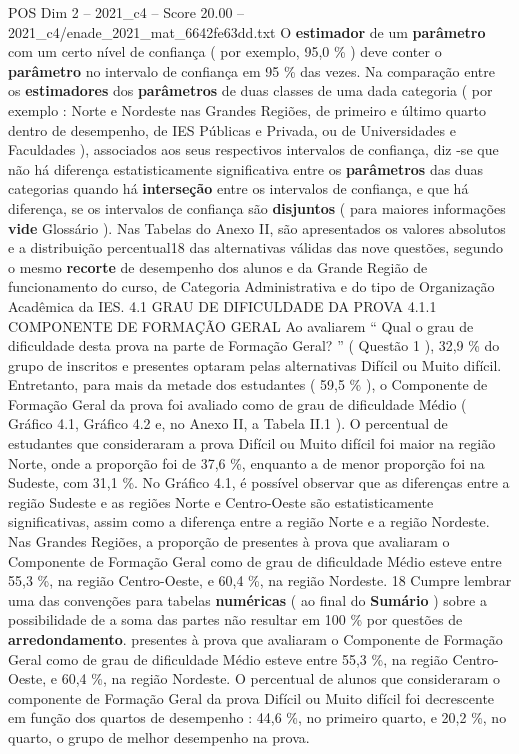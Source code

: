 \begin{textsample}{POS Dim 2 – 2021\_c4 – Score 20.00 – 2021\_c4/enade\_2021\_mat\_6642fe63dd.txt}
O \textbf{estimador} de um \textbf{parâmetro} com um certo nível de confiança ( por exemplo, 95,0 \% ) deve conter o \textbf{parâmetro} no intervalo de confiança em 95 \% das vezes.
Na comparação entre os \textbf{estimadores} dos \textbf{parâmetros} de duas classes de uma dada categoria ( por exemplo : Norte e Nordeste nas Grandes Regiões, de primeiro e último quarto dentro de desempenho, de IES Públicas e Privada, ou de Universidades e Faculdades ), associados aos seus respectivos intervalos de confiança, diz -se que não há diferença estatisticamente significativa entre os \textbf{parâmetros} das duas categorias quando há \textbf{interseção} entre os intervalos de confiança, e que há diferença, se os intervalos de confiança são \textbf{disjuntos} ( para maiores informações \textbf{vide} Glossário ).
Nas Tabelas do Anexo II, são apresentados os valores absolutos e a distribuição percentual18 das alternativas válidas das nove questões, segundo o mesmo \textbf{recorte} de desempenho dos alunos e da Grande Região de funcionamento do curso, de Categoria Administrativa e do tipo de Organização Acadêmica da IES. 4.1 GRAU DE DIFICULDADE DA PROVA 4.1.1 COMPONENTE DE FORMAÇÃO GERAL Ao avaliarem “ Qual o grau de dificuldade desta prova na parte de Formação Geral? ” ( Questão 1 ), 32,9 \% do grupo de inscritos e presentes optaram pelas alternativas Difícil ou Muito difícil.
Entretanto, para mais da metade dos estudantes ( 59,5 \% ), o Componente de Formação Geral da prova foi avaliado como de grau de dificuldade Médio ( Gráfico 4.1, Gráfico 4.2 e, no Anexo II, a Tabela II.1 ).
O percentual de estudantes que consideraram a prova Difícil ou Muito difícil foi maior na região Norte, onde a proporção foi de 37,6 \%, enquanto a de menor proporção foi na Sudeste, com 31,1 \%.
No Gráfico 4.1, é possível observar que as diferenças entre a região Sudeste e as regiões Norte e Centro-Oeste são estatisticamente significativas, assim como a diferença entre a região Norte e a região Nordeste.
Nas Grandes Regiões, a proporção de presentes à prova que avaliaram o Componente de Formação Geral como de grau de dificuldade Médio esteve entre 55,3 \%, na região Centro-Oeste, e 60,4 \%, na região Nordeste. 18 Cumpre lembrar uma das convenções para tabelas \textbf{numéricas} ( ao final do \textbf{Sumário} ) sobre a possibilidade de a soma das partes não resultar em 100 \% por questões de \textbf{arredondamento}. presentes à prova que avaliaram o Componente de Formação Geral como de grau de dificuldade Médio esteve entre 55,3 \%, na região Centro-Oeste, e 60,4 \%, na região Nordeste.
O percentual de alunos que consideraram o componente de Formação Geral da prova Difícil ou Muito difícil foi decrescente em função dos quartos de desempenho : 44,6 \%, no primeiro quarto, e 20,2 \%, no quarto, o grupo de melhor desempenho na prova.

\end{textsample}
